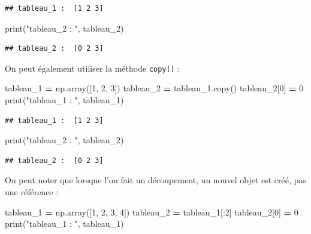 \documentclass[12pt,]{book}
\newenvironment{Shaded}{\begin{snugshade}}{\end{snugshade}}
\newcommand{\DecValTok}[1]{\textcolor[rgb]{0.00,0.00,0.81}{#1}}
\newcommand{\StringTok}[1]{\textcolor[rgb]{0.31,0.60,0.02}{#1}}
\newcommand{\OperatorTok}[1]{\textcolor[rgb]{0.81,0.36,0.00}{\textbf{#1}}}
\newcommand{\BuiltInTok}[1]{#1}
\newcommand{\NormalTok}[1]{#1}
\numberwithin{equation}{section}
\numberwithin{countremarque}{section}
\begin{document}
\begin{lstlisting}
## tableau_1 :  [1 2 3]
\end{lstlisting}

\begin{Shaded}
\begin{Highlighting}[]
\BuiltInTok{print}\NormalTok{(}\StringTok{"tableau_2 : "}\NormalTok{, tableau_2)}
\end{Highlighting}
\end{Shaded}

\begin{lstlisting}
## tableau_2 :  [0 2 3]
\end{lstlisting}

On peut également utiliser la méthode \texttt{copy()} :

\begin{Shaded}
\begin{Highlighting}[]
\NormalTok{tableau_1 }\OperatorTok{=}\NormalTok{ np.array([}\DecValTok{1}\NormalTok{, }\DecValTok{2}\NormalTok{, }\DecValTok{3}\NormalTok{])}
\NormalTok{tableau_2 }\OperatorTok{=}\NormalTok{ tableau_1.copy()}
\NormalTok{tableau_2[}\DecValTok{0}\NormalTok{] }\OperatorTok{=} \DecValTok{0}
\BuiltInTok{print}\NormalTok{(}\StringTok{"tableau_1 : "}\NormalTok{, tableau_1)}
\end{Highlighting}
\end{Shaded}

\begin{lstlisting}
## tableau_1 :  [1 2 3]
\end{lstlisting}

\begin{Shaded}
\begin{Highlighting}[]
\BuiltInTok{print}\NormalTok{(}\StringTok{"tableau_2 : "}\NormalTok{, tableau_2)}
\end{Highlighting}
\end{Shaded}

\begin{lstlisting}
## tableau_2 :  [0 2 3]
\end{lstlisting}

On peut noter que lorsque l'on fait un découpement, un nouvel objet est
créé, pas une référence :

\begin{Shaded}
\begin{Highlighting}[]
\NormalTok{tableau_1 }\OperatorTok{=}\NormalTok{ np.array([}\DecValTok{1}\NormalTok{, }\DecValTok{2}\NormalTok{, }\DecValTok{3}\NormalTok{, }\DecValTok{4}\NormalTok{])}
\NormalTok{tableau_2 }\OperatorTok{=}\NormalTok{ tableau_1[:}\DecValTok{2}\NormalTok{]}
\NormalTok{tableau_2[}\DecValTok{0}\NormalTok{] }\OperatorTok{=} \DecValTok{0}
\BuiltInTok{print}\NormalTok{(}\StringTok{"tableau_1 : "}\NormalTok{, tableau_1)}
\end{Highlighting}
\end{Shaded}
\end{document}
